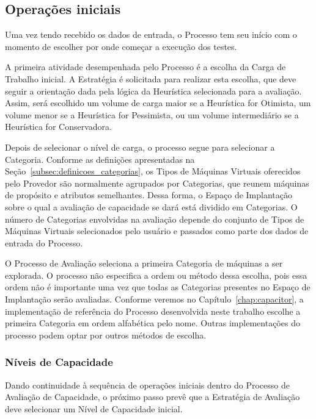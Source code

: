 \subsection{Operações iniciais}
\label{subsec:processo_operacoes_iniciais}
Uma vez tendo recebido os dados de entrada, o Processo tem seu início com o momento 
de escolher por onde começar a execução dos testes.

A primeira atividade desempenhada pelo Processo é a escolha da Carga de Trabalho
inicial. A Estratégia é solicitada para realizar esta escolha, que deve
seguir a orientação dada pela lógica da Heurística selecionada para 
a avaliação. Assim, será escolhido
um volume de carga maior se a Heurística for Otimista, um volume menor se a
Heurística for Pessimista, ou um volume intermediário se a Heurística for Conservadora. 

Depois de selecionar o nível de carga, o processo segue para selecionar a
Categoria. Conforme as definições apresentadas na Seção~\ref{subsec:definicoes_categorias}, 
os Tipos de Máquinas Virtuais oferecidos pelo Provedor são normalmente agrupados 
por Categorias, que reunem máquinas de propósito e atributos semelhantes. Dessa
forma, o Espaço de Implantação sobre o qual a avaliação de capacidade se dará está 
dividido em Categorias. O número de Categorias envolvidas na avaliação depende do 
conjunto de Tipos de Máquinas Virtuais selecionados pelo usuário e passados como
parte dos dados de entrada do Processo.

O Processo de Avaliação seleciona a primeira
Categoria de máquinas a ser explorada. O processo não especifica a ordem ou método 
dessa escolha, pois essa ordem não é importante uma vez que todas as Categorias 
presentes no Espaço de Implantação serão avaliadas. Conforme veremos no 
Capítulo~\ref{chap:capacitor}, a implementação de referência do Processo 
desenvolvida neste trabalho escolhe a primeira Categoria em ordem alfabética pelo
nome. Outras implementações do processo podem optar por outros métodos de
escolha.



\subsubsection{Níveis de Capacidade}
\label{subsec:processo_niveis_capacidade}
Dando continuidade à sequência de operações iniciais dentro do Processo de Avaliação 
de Capacidade, o próximo passo prevê que a Estratégia de Avaliação deve selecionar 
um Nível de Capacidade inicial. 

